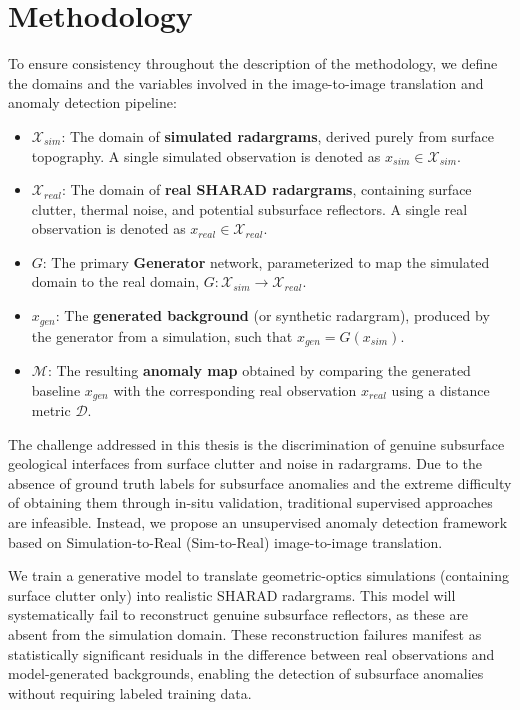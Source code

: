 \chapter{Methodology}
\label{cha:methodology}
To ensure consistency throughout the description of the methodology, we define the domains and the variables involved in the image-to-image translation and anomaly detection pipeline:
\begin{itemize}
    \item $\mathcal{X}_{sim}$: The domain of \textbf{simulated radargrams}, derived purely from surface topography. A single simulated observation is denoted as $x_{sim} \in \mathcal{X}_{sim}$.
    \item $\mathcal{X}_{real}$: The domain of \textbf{real SHARAD radargrams}, containing surface clutter, thermal noise, and potential subsurface reflectors. A single real observation is denoted as $x_{real} \in \mathcal{X}_{real}$.
    \item $G$: The primary \textbf{Generator} network, parameterized to map the simulated domain to the real domain, $G: \mathcal{X}_{sim} \rightarrow \mathcal{X}_{real}$.
    \item $x_{gen}$: The \textbf{generated background} (or synthetic radargram), produced by the generator from a simulation, such that $x_{gen} = G(x_{sim})$.
    \item $\mathcal{M}$: The resulting \textbf{anomaly map} obtained by comparing the generated baseline $x_{gen}$ with the corresponding real observation $x_{real}$ using a distance metric $\mathcal{D}$.
\end{itemize}

The challenge addressed in this thesis is the discrimination of genuine subsurface geological interfaces from surface clutter and noise in radargrams.
Due to the absence of ground truth labels for subsurface anomalies and the extreme difficulty of obtaining them through in-situ validation, traditional supervised approaches are infeasible.
Instead, we propose an unsupervised anomaly detection framework based on Simulation-to-Real (Sim-to-Real) image-to-image translation.

We train a generative model to translate geometric-optics simulations (containing surface clutter only) into realistic SHARAD radargrams.
This model will systematically fail to reconstruct genuine subsurface reflectors, as these are absent from the simulation domain.
These reconstruction failures manifest as statistically significant residuals in the difference between real observations and model-generated backgrounds, enabling the detection of subsurface anomalies without requiring labeled training data.

